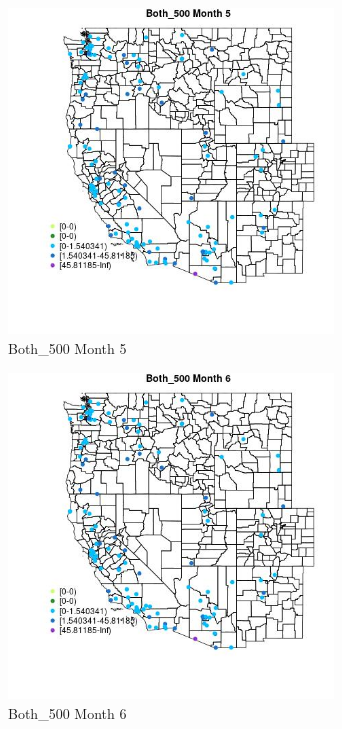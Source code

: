 \begin{figure} 
\centering  
\includegraphics[width=0.77\textwidth]{Code_Outputs/Report_ML_input_PM25_Step4_part_e_de_duplicated_aves_MapObsMo5Both_500.jpg} 
\caption{\label{fig:Report_ML_input_PM25_Step4_part_e_de_duplicated_avesMapObsMo5Both_500}Both_500 Month 5} 
\end{figure} 
 

\begin{figure} 
\centering  
\includegraphics[width=0.77\textwidth]{Code_Outputs/Report_ML_input_PM25_Step4_part_e_de_duplicated_aves_MapObsMo6Both_500.jpg} 
\caption{\label{fig:Report_ML_input_PM25_Step4_part_e_de_duplicated_avesMapObsMo6Both_500}Both_500 Month 6} 
\end{figure} 
 

